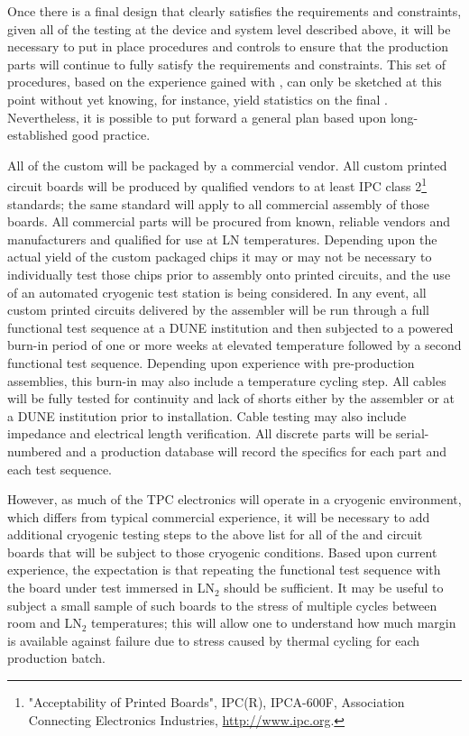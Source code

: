 Once there is a final design that clearly satisfies the requirements and constraints, given all of the testing at the device and system level described above, it will be necessary to put in place procedures and controls to ensure that the production  parts will continue to fully satisfy the requirements and constraints. This set of  procedures, based on the experience gained with , can only be sketched at this point without yet knowing, for instance, yield statistics on the final . Nevertheless, it is possible to put forward a general plan based upon long-established good practice.

All of the custom  will be packaged by a commercial vendor. 
All custom printed circuit boards will be produced by qualified vendors to at least IPC class 2\footnote{ "Acceptability of Printed Boards", IPC(R), IPCA-600F, Association Connecting Electronics Industries\texttrademark{}, \url{http://www.ipc.org}.} standards; the same standard will apply to all commercial assembly of those boards. 
All commercial parts will be procured from known, reliable vendors and manufacturers and qualified for use at LN temperatures. Depending upon the actual yield of the custom packaged chips it may or may not be necessary to individually test those chips prior to assembly onto printed circuits, and the use of an automated cryogenic test station is being considered. In any event, all custom printed circuits delivered by the assembler will be run through a full functional test sequence at a DUNE institution and then subjected to a powered burn-in period of one or more weeks at elevated temperature followed by a second functional test sequence. Depending upon experience with pre-production assemblies, this burn-in may also include a temperature cycling step. All cables will be fully tested for continuity and lack of shorts either by the assembler or at a DUNE institution prior to installation. Cable testing may also include impedance and electrical length verification. All discrete  parts will be serial-numbered and a production database will record the specifics for each part and each test sequence.

However, as much of the  %
TPC electronics will operate in a cryogenic environment, which differs from typical commercial experience, it will be necessary to add additional cryogenic testing steps to the above list for all of the  and circuit boards that will be subject to those cryogenic conditions. Based upon current experience, the expectation is that repeating the functional test sequence with the board under test immersed in LN$_2$ should be sufficient. It may be useful to subject a small sample of such boards to the stress of multiple cycles between room and LN$_2$ temperatures; this will allow one to understand how much margin is available against failure due to stress caused by thermal cycling for each production batch.

